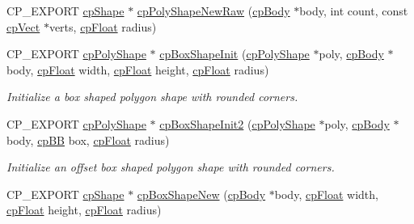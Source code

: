 \begin{DoxyCompactItemize}
\item 
C\+P\+\_\+\+E\+X\+P\+O\+RT \mbox{\hyperlink{structcp_shape}{cp\+Shape}} $\ast$ \mbox{\hyperlink{group__cp_poly_shape_ga5a63f33779a54ccc7b4dbff26576683e}{cp\+Poly\+Shape\+New\+Raw}} (\mbox{\hyperlink{structcp_body}{cp\+Body}} $\ast$body, int count, const \mbox{\hyperlink{structcp_vect}{cp\+Vect}} $\ast$verts, \mbox{\hyperlink{group__basic_types_gac1ed65573e035bf892505768c852d8d3}{cp\+Float}} radius)
\item 
\mbox{\label{group__cp_poly_shape_gadd5888303fa4f2cf7b06ea581b911773}} 
C\+P\+\_\+\+E\+X\+P\+O\+RT \mbox{\hyperlink{structcp_poly_shape}{cp\+Poly\+Shape}} $\ast$ \mbox{\hyperlink{group__cp_poly_shape_gadd5888303fa4f2cf7b06ea581b911773}{cp\+Box\+Shape\+Init}} (\mbox{\hyperlink{structcp_poly_shape}{cp\+Poly\+Shape}} $\ast$poly, \mbox{\hyperlink{structcp_body}{cp\+Body}} $\ast$body, \mbox{\hyperlink{group__basic_types_gac1ed65573e035bf892505768c852d8d3}{cp\+Float}} width, \mbox{\hyperlink{group__basic_types_gac1ed65573e035bf892505768c852d8d3}{cp\+Float}} height, \mbox{\hyperlink{group__basic_types_gac1ed65573e035bf892505768c852d8d3}{cp\+Float}} radius)
\begin{DoxyCompactList}\small\item\em Initialize a box shaped polygon shape with rounded corners. \end{DoxyCompactList}\item 
\mbox{\label{group__cp_poly_shape_ga0c024c6f93197f94c96ee3985784ca36}} 
C\+P\+\_\+\+E\+X\+P\+O\+RT \mbox{\hyperlink{structcp_poly_shape}{cp\+Poly\+Shape}} $\ast$ \mbox{\hyperlink{group__cp_poly_shape_ga0c024c6f93197f94c96ee3985784ca36}{cp\+Box\+Shape\+Init2}} (\mbox{\hyperlink{structcp_poly_shape}{cp\+Poly\+Shape}} $\ast$poly, \mbox{\hyperlink{structcp_body}{cp\+Body}} $\ast$body, \mbox{\hyperlink{structcp_b_b}{cp\+BB}} box, \mbox{\hyperlink{group__basic_types_gac1ed65573e035bf892505768c852d8d3}{cp\+Float}} radius)
\begin{DoxyCompactList}\small\item\em Initialize an offset box shaped polygon shape with rounded corners. \end{DoxyCompactList}\item 
\mbox{\label{group__cp_poly_shape_ga6757a0b7cce817ff2d56e8d645327300}} 
C\+P\+\_\+\+E\+X\+P\+O\+RT \mbox{\hyperlink{structcp_shape}{cp\+Shape}} $\ast$ \mbox{\hyperlink{group__cp_poly_shape_ga6757a0b7cce817ff2d56e8d645327300}{cp\+Box\+Shape\+New}} (\mbox{\hyperlink{structcp_body}{cp\+Body}} $\ast$body, \mbox{\hyperlink{group__basic_types_gac1ed65573e035bf892505768c852d8d3}{cp\+Float}} width, \mbox{\hyperlink{group__basic_types_gac1ed65573e035bf892505768c852d8d3}{cp\+Float}} height, \mbox{\hyperlink{group__basic_types_gac1ed65573e035bf892505768c852d8d3}{cp\+Float}} radius)

\end{DoxyCompactItemize}
